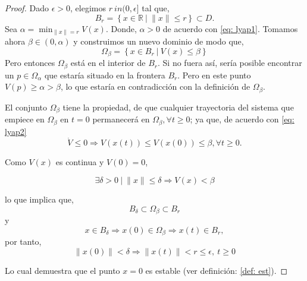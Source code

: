 \begin{proof}
Dado $\epsilon > 0$, elegimos $r \ in (0,\epsilon]$ tal que,
\begin{equation*}
B_r = \left\{ x \in \mathbb{R} \ |\  \|x\| \leq r \right\} \subset D.
\end{equation*}
Sea $\alpha =  \min_{\|x\| = r}V(x)$. Donde, $\alpha >0$ de acuerdo con \ref{eq: lyap1}. Tomamos ahora $\beta \in (0,\alpha)$ y construimos un nuevo dominio de modo que,
\begin{equation*}
\Omega_\beta = \left\{ x \in B_r \ |\  V(x) \leq \beta \right\}
\end{equation*}
Pero entonces $\Omega_\beta$ está en el interior de $B_r$.  Si no fuera así, sería posible encontrar un $p \in \Omega_\alpha$ que estaría situado en la frontera $B_r$. Pero en este punto $V(p) \ge \alpha > \beta$, lo que estaría en contradicción con la definición de $\Omega_\beta$. 

El conjunto $\Omega_\beta$ tiene la propiedad, de que cualquier trayectoria del sistema que empiece en $\Omega_\beta$  en $t=0$ permanecerá en $\Omega_\beta, \forall t \geq 0$; ya que, de acuerdo con \ref{eq: lyap2}
\begin{equation*}
\dot V \leq 0 \Rightarrow V(x(t)) \leq V(x(0)) \leq \beta, \forall t \geq 0.
\end{equation*}

Como $V(x)$ es continua y $V(0) = 0$,

\begin{equation*}
\exists \delta > 0\  |\  \|x\| \leq \delta \Rightarrow V(x) < \beta
\end {equation*}

lo que implica que,
\begin{equation*}
B_\delta \subset \Omega_\beta \subset B_r
\end{equation*}
y
\begin{equation*}
x \in B_\delta \Rightarrow x(0) \in \Omega_\beta \Rightarrow x(t) \in B_r,
\end{equation*}
por tanto,
\begin{equation*}
\|x(0)\| < \delta \Rightarrow \|x(t)\|<r \leq \epsilon, \ t \geq 0
\end{equation*}

Lo cual demuestra que el punto $x=0$ es estable (ver definición: \ref{def: est}). 


\end{proof}
